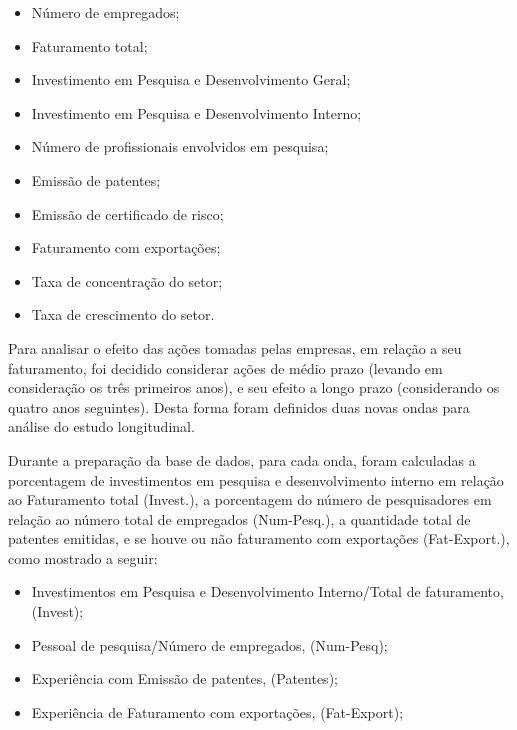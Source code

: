 \documentclass[kdmile,a4paper]{kdmile} %
\begin{document}
\begin{itemize}
    \item Número de empregados;
    \item Faturamento total;
    \item Investimento em Pesquisa e Desenvolvimento Geral;
    \item Investimento em Pesquisa e Desenvolvimento Interno;
    \item Número de profissionais envolvidos em pesquisa;
    \item Emissão de patentes;
    \item Emissão de certificado de risco;
    \item Faturamento com exportações;
    \item Taxa de concentração do setor;
    \item Taxa de crescimento do setor.
\end{itemize}

Para analisar o efeito das ações tomadas pelas empresas, em relação a seu faturamento, foi decidido considerar ações de médio prazo (levando em consideração os três primeiros anos), e seu efeito a longo prazo (considerando os quatro anos seguintes). Desta forma foram definidos duas novas ondas para análise do estudo longitudinal.

Durante a preparação da base de dados, para cada onda, foram calculadas a porcentagem de investimentos em pesquisa e desenvolvimento interno em relação ao Faturamento total (Invest.), a porcentagem do número de pesquisadores em relação ao número total de empregados (Num-Pesq.), a quantidade total de patentes emitidas, e se houve ou não faturamento com exportações (Fat-Export.), como mostrado a seguir:


\begin{itemize}
    \item Investimentos em Pesquisa e Desenvolvimento Interno/Total de faturamento, (Invest);
    \item Pessoal de pesquisa/Número de empregados, (Num-Pesq);
    \item Experiência com Emissão de patentes, (Patentes);
    \item Experiência de Faturamento com exportações, (Fat-Export);
\end{itemize}
\end{document}
